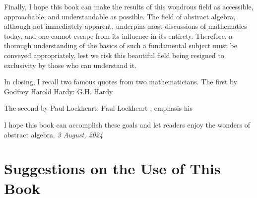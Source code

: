 Finally, I hope this book can make the results of this wondrous field as accessible, approachable, and understandable as possible. The field of abstract algebra, although not immediately apparent, underpins most discussions of mathematics today, and one cannot escape from its influence in its entirety. Therefore, a thorough understanding of the basics of such a fundamental subject must be conveyed appropriately, lest we risk this beautiful field being resigned to exclusivity by those who can understand it.

In closing, I recall two famous quotes from two mathematicians. The first by Godfrey Harold Hardy:
    {G.H. Hardy}
    {\cite[p.~43]{hardy_snow_1969}}

The second by Paul Lockheart:
    {Paul Lockheart}
    {\cite[p.~8]{lockheart_2002}, emphasis his}

I hope this book can accomplish these goals and let readers enjoy the wonders of abstract algebra.
\hfill{\textit{3 August, 2024}}

\chapter{Suggestions on the Use of This Book}
